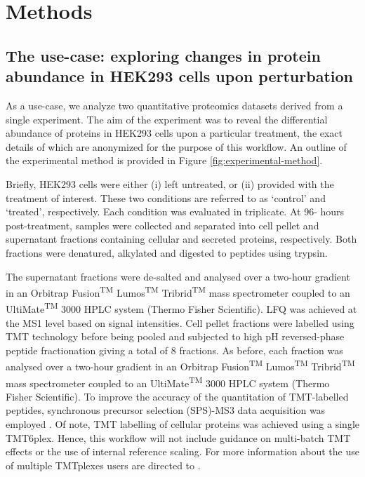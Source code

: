 \documentclass[9pt,a4paper,]{extarticle}
\begin{document}
\section{Methods}\label{methods}

\subsection{The use-case: exploring changes in protein abundance in HEK293 cells upon perturbation}\label{the-use-case-exploring-changes-in-protein-abundance-in-hek293-cells-upon-perturbation}

As a use-case, we analyze two quantitative proteomics datasets derived from a
single experiment. The aim of the experiment was to reveal the differential
abundance of proteins in HEK293 cells upon a particular treatment, the exact
details of which are anonymized for the purpose of this workflow. An outline of
the experimental method is provided in Figure \ref{fig:experimental-method}.

Briefly, HEK293 cells were either (i) left untreated, or (ii) provided with the
treatment of interest. These two conditions are referred to as `control' and
`treated', respectively. Each condition was evaluated in triplicate. At 96-
hours post-treatment, samples were collected and separated into cell pellet and
supernatant fractions containing cellular and secreted proteins, respectively.
Both fractions were denatured, alkylated and digested to peptides using trypsin.

The supernatant fractions were de-salted and analysed over a two-hour gradient
in an Orbitrap Fusion\textsuperscript{TM} Lumos\textsuperscript{TM} Tribrid\textsuperscript{TM} mass spectrometer coupled to an
UltiMate\textsuperscript{TM} 3000 HPLC system (Thermo Fisher Scientific). LFQ was achieved at the
MS1 level based on signal intensities. Cell pellet fractions were labelled using
TMT technology before being pooled and subjected to high pH reversed-phase peptide
fractionation giving a total of 8 fractions. As before, each fraction was
analysed over a two-hour gradient in an Orbitrap Fusion\textsuperscript{TM} Lumos\textsuperscript{TM} Tribrid\textsuperscript{TM}
mass spectrometer coupled to an UltiMate\textsuperscript{TM} 3000 HPLC system (Thermo Fisher
Scientific). To improve the accuracy of the quantitation of TMT-labelled peptides,
synchronous precursor selection (SPS)-MS3 data acquisition was employed
\citep{McAlister2014, Ting2011}. Of note, TMT labelling of cellular proteins was
achieved using a single TMT6plex. Hence, this workflow will not include guidance
on multi-batch TMT effects or the use of internal reference scaling. For more
information about the use of multiple TMTplexes users are directed to \citep{Plubell2017, Brenes2019}.
\end{document}
